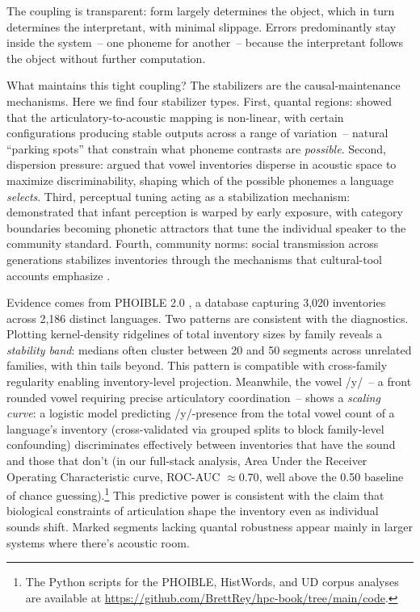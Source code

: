 The coupling is transparent: form largely determines the object, which in turn determines the interpretant, with minimal slippage. Errors predominantly stay inside the system~-- one phoneme for another~-- because the interpretant follows the object without further computation.

What maintains this tight coupling? The stabilizers are the causal-maintenance mechanisms. Here we find four stabilizer types. First, quantal regions: \textcite{stevens1989} showed that the articulatory-to-acoustic mapping is non-linear, with certain configurations producing stable outputs across a range of variation~-- natural \enquote{parking spots} that constrain what phoneme contrasts are \emph{possible}. Second, dispersion pressure: \textcite{lindblom1990} argued that vowel inventories disperse in acoustic space to maximize discriminability, shaping which of the possible phonemes a language \emph{selects}. Third, perceptual tuning acting as a stabilization mechanism: \textcite{kuhl1992} demonstrated that infant perception is warped by early exposure, with category boundaries becoming phonetic attractors that tune the individual speaker to the community standard. Fourth, community norms: social transmission across generations stabilizes inventories through the mechanisms that cultural-tool accounts emphasize \parencite{ekstrom2025}.

Evidence comes from PHOIBLE 2.0 \parencite{moran2019phoible}, a database capturing 3,020 inventories across 2,186 distinct languages. Two patterns are consistent with the diagnostics. Plotting kernel-density ridgelines of total inventory sizes by family reveals a \emph{stability band}: medians often cluster between 20 and 50 segments across unrelated families, with thin tails beyond. This pattern is compatible with cross-family regularity enabling inventory-level projection. Meanwhile, the vowel /y/~-- a front rounded vowel requiring precise articulatory coordination~-- shows a \emph{scaling curve}: a logistic model predicting /y/-presence from the total vowel count of a language's inventory (cross-validated via grouped splits to block family-level confounding) discriminates effectively between inventories that have the sound and those that don't (in our full-stack analysis, Area Under the Receiver Operating Characteristic curve, ROC-AUC $\approx 0.70$, well above the 0.50 baseline of chance guessing).\footnote{The Python scripts for the PHOIBLE, HistWords, and UD corpus analyses are available at \url{https://github.com/BrettRey/hpc-book/tree/main/code}.} This predictive power is consistent with the claim that biological constraints of articulation shape the inventory even as individual sounds shift. Marked segments lacking quantal robustness appear mainly in larger systems where there's acoustic room.

